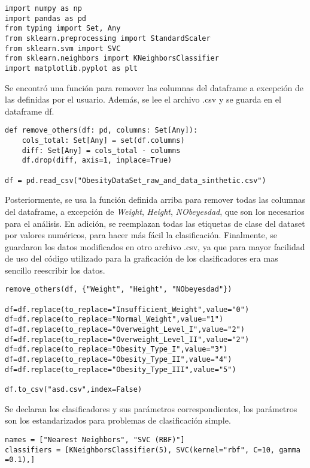\documentclass{article}
\begin{document}
\begin{lstlisting}
import numpy as np
import pandas as pd
from typing import Set, Any 
from sklearn.preprocessing import StandardScaler
from sklearn.svm import SVC
from sklearn.neighbors import KNeighborsClassifier
import matplotlib.pyplot as plt
\end{lstlisting}

Se encontró una función para remover las columnas del dataframe a excepción de las definidas por el usuario. Además, se lee el archivo .csv y se guarda en el dataframe df.
\begin{lstlisting}
def remove_others(df: pd, columns: Set[Any]):
    cols_total: Set[Any] = set(df.columns)
    diff: Set[Any] = cols_total - columns
    df.drop(diff, axis=1, inplace=True)

df = pd.read_csv("ObesityDataSet_raw_and_data_sinthetic.csv")
\end{lstlisting}

Posteriormente, se usa la función definida arriba para remover todas las columnas del dataframe, a excepción de \textit{Weight}, \textit{Height}, \textit{NObeyesdad}, que son los necesarios para el análisis. En adición, se reemplazan todas las etiquetas de clase del dataset por valores numéricos, para hacer más fácil la clasificación. Finalmente, se guardaron los datos modificados en otro archivo .csv, ya que para mayor facilidad de uso del código utilizado para la graficación de los clasificadores era mas sencillo reescribir los datos.
\clearpage
\begin{lstlisting}
remove_others(df, {"Weight", "Height", "NObeyesdad"})

df=df.replace(to_replace="Insufficient_Weight",value="0")
df=df.replace(to_replace="Normal_Weight",value="1")
df=df.replace(to_replace="Overweight_Level_I",value="2")
df=df.replace(to_replace="Overweight_Level_II",value="2")
df=df.replace(to_replace="Obesity_Type_I",value="3")
df=df.replace(to_replace="Obesity_Type_II",value="4")
df=df.replace(to_replace="Obesity_Type_III",value="5")

df.to_csv("asd.csv",index=False)
\end{lstlisting}

Se declaran los clasificadores y sus parámetros correspondientes, los parámetros son los estandarizados para problemas de clasificación simple.

\begin{lstlisting}
names = ["Nearest Neighbors", "SVC (RBF)"]
classifiers = [KNeighborsClassifier(5), SVC(kernel="rbf", C=10, gamma =0.1),]
\end{lstlisting}
\end{document}
